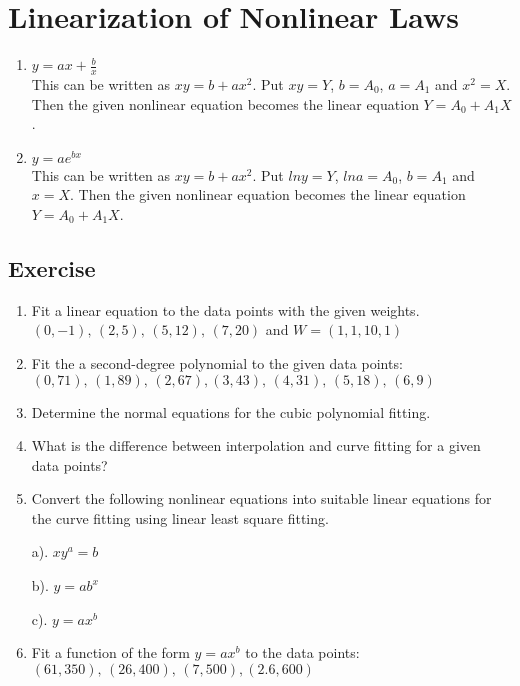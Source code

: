 \documentclass[aima203_lecturenotes_ku.tex]{subfiles}
\begin{document}
\section{Linearization of Nonlinear Laws}
\begin{enumerate}
\item $\displaystyle y =ax + \frac{b}{x}$ \\[1mm]
  This can be written as $xy = b + ax^2$. Put $xy=Y$, $b=A_0$, $ a= A_1$ and $x^2 = X$. Then the given nonlinear equation becomes the linear equation $Y = A_0 + A_1X$.

  \item $\displaystyle y =ae^{bx}$ \\[1mm]
This can be written as $xy = b + ax^2$. Put $lny=Y$, $lna=A_0$, $b=A_1$ and $x = X$. Then the given nonlinear equation becomes the linear equation $Y = A_0 + A_1X$.
\end{enumerate}

\subsection{Exercise}
\begin{enumerate}
\item Fit a linear equation to the data points with the given weights. \\
  $(0,-1), \, (2,5), \, (5,12), \, (7,20)$ and $W=(1,1,10,1)$
\item Fit the a second-degree polynomial to the given data points: \\
  $(0,71), \, (1,89), \, (2,67), (3,43), \, (4,31), \, (5,18), \, (6,9)$

\item Determine the normal equations for the cubic polynomial fitting.
\item What is the difference between interpolation and curve fitting for a given data points?
\item Convert the following nonlinear equations into suitable linear equations for the curve fitting using linear least square fitting.
  \begin{multicols}{3}
    a). $xy^a=b$
    \columnbreak

    b). $y=ab^x$
    \columnbreak

    c). $y=ax^b$
  \end{multicols}

\item Fit a function of the form $y=ax^b$ to the data points:
  $(61,350), \, (26,400), \, (7,500), (2.6,600)$

\end{enumerate}
\end{document}
